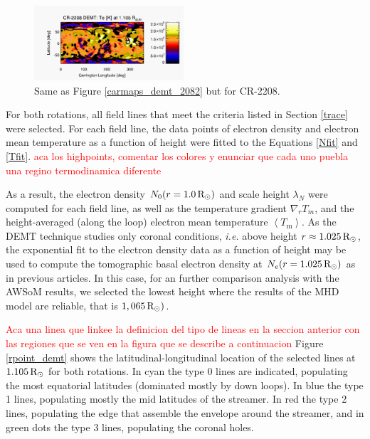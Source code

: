 \documentclass[namedreferences]{solarphysics}
\newcommand{\mrsun}{{\rm R_\odot}}
\newcommand{\lN}{\lambda_N}
\newcommand{\aTm}{\left< T_\textrm{m}\right>}
\begin{document}
\begin{article}
\begin{figure}[h!]
\begin{center}
\includegraphics[width=0.495\textwidth]{figs/map_Tm_CR2208_DEMT-AIA_H1_L522_r3d_1105_Rsun.pdf}
\caption{Same as Figure \ref{carmaps_demt_2082} but for CR-2208.}
\label{carmaps_demt_2208}
\end{center}
\end{figure}



For both rotations, all field lines that meet the criteria listed in Section \ref{trace} were selected. For each field line, the data points of electron density and electron mean temperature as a function of height were fitted to the Equations \ref{Nfit} and \ref{Tfit}.
\textcolor{red}{aca los highpoints, comentar los colores y enunciar que cada uno puebla una regino termodinamica diferente}


 As a result, the electron density $N_0(r=1.0\,\mrsun)$ and scale height $\lN$ were computed for each field line, as well as the temperature gradient $\nabla_r T_m$, and the height-averaged (along the loop) electron mean temperature $\aTm$. As the DEMT technique studies only coronal conditions, \textit{i.e.} above height $r\approx 1.025\,\mrsun$, the exponential fit to the electron density data as a function of height may be used to compute the tomographic basal electron density at $ N_e(r=1.025\,\mrsun)$ as in previous articles. In this case, for an further comparison analysis with the AWSoM results, we selected the lowest height where the results of the MHD model are reliable, that is $1,065\,\mrsun)$.

\textcolor{red}{Aca una linea que linkee la definicion del tipo de lineas en la seccion anterior con las regiones que se ven en la figura que se describe a continuacion}
Figure \ref{rpoint_demt} shows the latitudinal-longitudinal location of the selected lines at $1.105\,\mrsun$ for both rotations. In cyan the type 0 lines are indicated, populating the most equatorial latitudes (dominated mostly by down loops). In blue the type 1 lines, populating mostly the mid latitudes of the streamer. In red the type 2 lines, populating the edge that assemble the envelope around the streamer, and in green dots the type 3 lines, populating the coronal holes.


\end{article}
\end{document}
